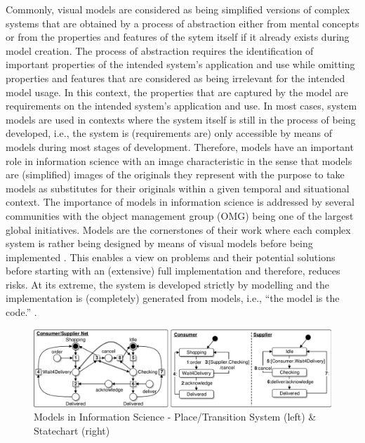 Commonly, visual models are considered as being simplified versions of complex systems \cite{Bezivin2005} that are obtained by a process of abstraction either from mental concepts or from the properties and features of the sytem itself if it already exists during model creation.
The process of abstraction requires the identification of important properties of the intended system's application and use while omitting properties and features that are considered as being irrelevant for the intended model usage.
In this context, the properties that are captured by the model are requirements on the intended system's application and use.
In most cases, system models are used in contexts where the system itself is still in the process of being developed, i.e., the system is (requirements are) only accessible by means of models during most stages of development.
Therefore, models have an important role in information science \cite{Fetzer20,Thalheim2011} with an image characteristic in the sense that models are (simplified) images of the originals they represent with the purpose to take models as substitutes for their originals within a given temporal and situational context.
The importance of models in information science is addressed by several communities with the object management group (OMG) being one of the largest global initiatives.
Models are the cornerstones of their work where each complex system is rather being designed by means of visual models before being implemented \cite{Janis01}.
This enables a view on problems and their potential solutions before starting with an (extensive) full implementation and therefore, reduces risks. 
At its extreme, the system is developed strictly by modelling and the implementation is (completely) generated from models, i.e., ``the model is the code.'' \cite{Thalheim2011}.

\begin{figure}[!tb]
\begin{center}
\includegraphics[width=\textwidth]{img/gen_intro/models.pdf}
\end{center}
\caption{Models in Information Science - Place/Transition System (left) \& Statechart (right)}
\label{fig:sec-gen-intro-models:models}
\end{figure}

